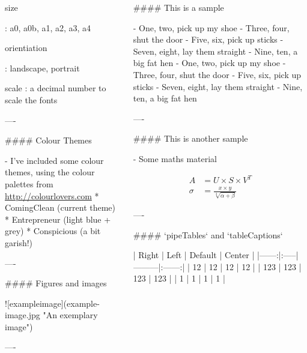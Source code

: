 \documentclass{beamer}
\begin{document}
\begin{frame}[fragile]
\begin{columns}[T]
\begin{column}{.46\textwidth}
\begin{markdown}
    size
    
    :   a0, a0b, a1, a2, a3, a4

    orientiation
    
    :   landscape, portrait
    
    scale
    :   a decimal number to scale the fonts

----

#### Colour Themes

- I've included some colour themes, using the colour palettes from \url{http://colourlovers.com}
    * ComingClean (current theme)
    * Entrepreneur (light blue + grey)
    * Conspicious (a bit garish!)

---- 

#### Figures and images


![exampleimage](example-image.jpg "An exemplary image")

----

\end{markdown}

\end{column}

\begin{column}{.46\textwidth}

\begin{markdown}

#### This is a sample

- One, two, pick up my shoe
- Three, four, shut the door
- Five, six, pick up sticks
- Seven, eight, lay them straight
- Nine, ten, a big fat hen
- One, two, pick up my shoe
- Three, four, shut the door
- Five, six, pick up sticks
- Seven, eight, lay them straight
- Nine, ten, a big fat hen

----

#### This is another sample

- Some maths material

\begin{align}
A &= U \times S \times V^T\\
\sigma &= \frac{x\times y}{\sqrt[3]{\alpha + \beta}}
\end{align}

----


#### `pipeTables` and `tableCaptions`

| Right | Left | Default | Center |
|------:|:-----|---------|:------:| 
|  12   |  12  |  12     |   12   | 
| 123   |  123 |   123   |  123   | 
|   1   |    1 |     1   |    1   | 


\end{markdown}
\end{column}
\end{columns}
\end{frame}
\end{document}
